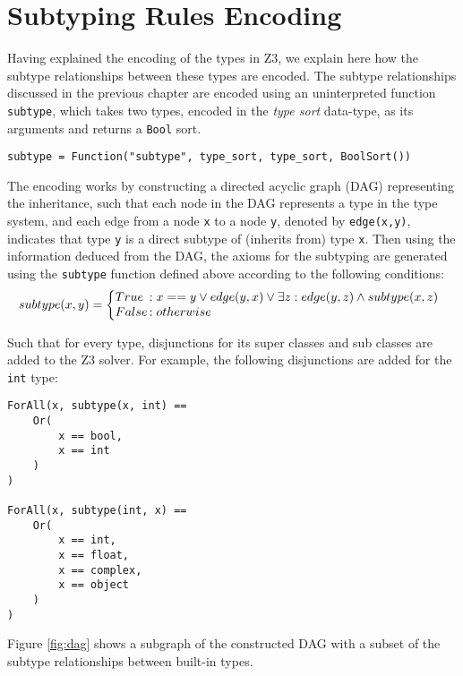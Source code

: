 \section{Subtyping Rules Encoding}
Having explained the encoding of the types in Z3, we explain here how the subtype relationships between these types are encoded. The subtype relationships discussed in the previous chapter are encoded using an uninterpreted function \lstinline|subtype|, which takes two types, encoded in the \textit{type sort} data-type, as its arguments and returns a \lstinline|Bool| sort.
\begin{lstlisting}
subtype = Function("subtype", type_sort, type_sort, BoolSort())
\end{lstlisting}

The encoding works by constructing a directed acyclic graph (DAG) representing the inheritance, such that each node in the DAG represents a type in the type system, and each edge from a node \lstinline|x| to a node \lstinline|y|, denoted by \lstinline|edge(x,y)|, indicates that type \lstinline|y| is a direct subtype of (inherits from) type \lstinline|x|. Then using the information deduced from the DAG, the axioms for the subtyping are generated using the \lstinline|subtype| function defined above according to the following conditions:
\[
	subtype(x,y) = \left\{
	\begin{array}{@{}l@{\thinspace}l}
	True & : x == y \lor edge(y, x) \lor \exists z : edge(y, z) \land subtype(x, z) \\
	False & : otherwise\\
	
	\end{array}
	\right.
\]

Such that for every type, disjunctions for its super classes and sub classes are added to the Z3 solver. For example, the following disjunctions are added for the \lstinline|int| type:

\begin{lstlisting}
ForAll(x, subtype(x, int) == 
	Or(
		x == bool,
		x == int
	)
)

ForAll(x, subtype(int, x) == 
	Or(
		x == int,
		x == float,
		x == complex,
		x == object
	)
)
\end{lstlisting}

Figure \ref{fig:dag} shows a subgraph of the constructed DAG with a subset of the subtype relationships between built-in types.

